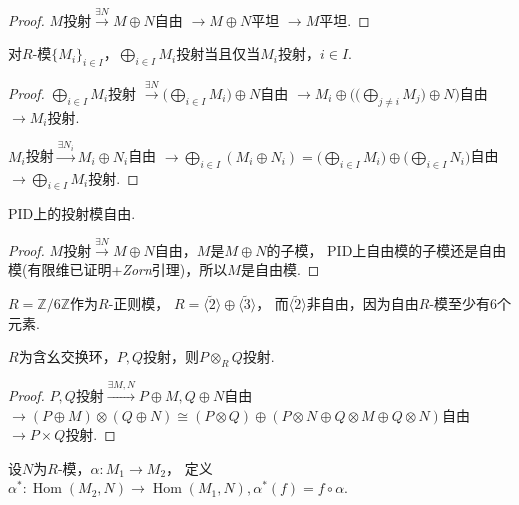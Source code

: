 \begin{proof}
$ M $投射$\xrightarrow{\exists N}M\oplus N$自由 
$\rightarrow M\oplus N$平坦 $\rightarrow M$平坦.
\end{proof}
    \begin{proposition}
        对$R$-模$\{M_i\}_{i\in I}$，$\bigoplus\limits_{i\in I}M_i$投射当且仅当$M_i$投射，$i\in I$.
    \end{proposition}
\begin{proof}
$\bigoplus\limits_{i\in I} M_i$投射
$\xrightarrow{\exists N}\big(\bigoplus\limits_{i\in I} M_i\big)\oplus N$自由
$\rightarrow M_i\oplus\big(\big(\bigoplus\limits_{j\neq i} M_j\big)\oplus N\big)$自由
$\rightarrow M_i$投射.

$M_i$投射$\xrightarrow{\exists N_i}M_i\oplus N_i$自由
$\rightarrow\bigoplus\limits_{i\in I}(M_i\oplus N_i)
=\big(\bigoplus\limits_{i\in I} M_i\big)\oplus\big(\bigoplus\limits_{i\in I} N_i\big)$自由
$\rightarrow\bigoplus\limits_{i\in I} M_i$投射.
\end{proof}
\begin{proposition}
    PID上的投射模自由.
\end{proposition}
\begin{proof}
$ M $投射$\xrightarrow{\exists N}M\oplus N$自由，$ M $是$ M\oplus N $的子模，
PID上自由模的子模还是自由模(有限维已证明+\textit{Zorn}引理)，所以$ M $是自由模.
\end{proof}
    \begin{example}
        $R=\mathbb{Z}/{6\mathbb{Z}}$作为$R$-正则模，
        $R=\langle\tilde{2}\rangle\oplus\langle\tilde{3}\rangle$，
        而$\langle\tilde{2}\rangle$非自由，因为自由$R$-模至少有$6$个元素.

    \end{example}
    \begin{proposition}
        $R$为含幺交换环，$P,Q$投射，则$P\otimes _R Q$投射.
    \end{proposition}
\begin{proof}
$P,Q$投射$\xrightarrow{\exists M,N}P\oplus M,Q\oplus N$自由
$\rightarrow (P\oplus M)\otimes(Q\oplus N)
\cong (P\otimes Q)\oplus(P\otimes N \oplus Q\otimes M \oplus Q\otimes N )$自由
$\rightarrow P\times Q$投射.
\end{proof}
    \begin{definition}
        设$N$为$R$-模，$\alpha:M_1\rightarrow M_2$，
        定义$\alpha^*:\operatorname{Hom}(M_2,N)\rightarrow
        \operatorname{Hom}(M_1,N),\alpha^*(f)=f\circ \alpha .$
    \end{definition}

